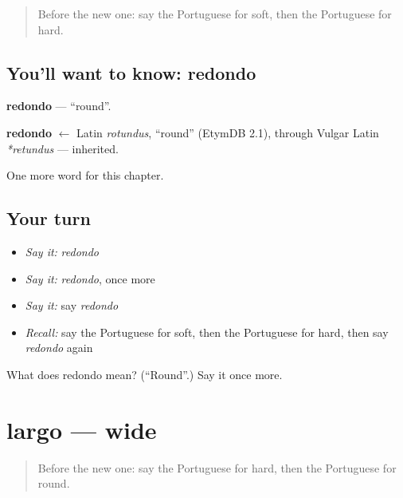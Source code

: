 \label{lesson:PT-C126-redondo}



\begin{quote}
Before the new one: say the Portuguese for soft, then the Portuguese for hard.
\end{quote}

\subsection*{You'll want to know: redondo}
\textbf{redondo} — \textquotedblleft{}round\textquotedblright{}.

\begin{cousinweb}
\textbf{redondo} $\leftarrow$ Latin \emph{rotundus}, \textquotedblleft{}round\textquotedblright{} (EtymDB 2.1), through Vulgar Latin \emph{*retundus} — inherited.
\end{cousinweb}

\begin{grammarlens}[title={What you've built}]
One more word for this chapter.
\end{grammarlens}

\subsection*{Your turn}
\begin{itemize}
\raggedright
  \item \emph{Say it:} \emph{redondo}
  \item \emph{Say it:} \emph{redondo}, once more
  \item \emph{Say it:} say \emph{redondo}
  \item \emph{Recall:} say the Portuguese for soft, then the Portuguese for hard, then say \emph{redondo} again
\end{itemize}

\begin{tcolorbox}[breakable,colback=teal!4,colframe=teal!35!black,title={Before you move on}]
What does redondo mean? (\textquotedblleft{}Round\textquotedblright{}.) Say it once more.
\end{tcolorbox}
\section[largo]{largo — wide}

\label{lesson:PT-C126-largo}



\begin{quote}
Before the new one: say the Portuguese for hard, then the Portuguese for round.
\end{quote}

